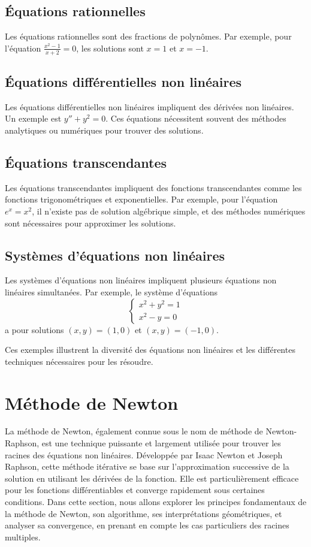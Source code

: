 \documentclass{article}
\begin{document}
\subsection{Équations rationnelles}
Les équations rationnelles sont des fractions de polynômes. Par exemple, pour l'équation $\frac{x^2 - 1}{x + 2} = 0$, les solutions sont $x = 1$ et $x = -1$.

\subsection{Équations différentielles non linéaires}
Les équations différentielles non linéaires impliquent des dérivées non linéaires. Un exemple est $y'' + y^2 = 0$. Ces équations nécessitent souvent des méthodes analytiques ou numériques pour trouver des solutions.

\subsection{Équations transcendantes}
Les équations transcendantes impliquent des fonctions transcendantes comme les fonctions trigonométriques et exponentielles. Par exemple, pour l'équation $e^x = x^2$, il n'existe pas de solution algébrique simple, et des méthodes numériques sont nécessaires pour approximer les solutions.

\subsection{Systèmes d'équations non linéaires}
Les systèmes d'équations non linéaires impliquent plusieurs équations non linéaires simultanées. Par exemple, le système d'équations
\[
\begin{cases}
x^2 + y^2 = 1 \\
x^2 - y = 0
\end{cases}
\]
a pour solutions $(x, y) = (1, 0)$ et $(x, y) = (-1, 0)$.

Ces exemples illustrent la diversité des équations non linéaires et les différentes techniques nécessaires pour les résoudre.

\section{Méthode de Newton}

La méthode de Newton, également connue sous le nom de méthode de Newton-Raphson, est une technique puissante et largement utilisée pour trouver les racines des équations non linéaires. Développée par Isaac Newton et Joseph Raphson, cette méthode itérative se base sur l'approximation successive de la solution en utilisant les dérivées de la fonction. Elle est particulièrement efficace pour les fonctions différentiables et converge rapidement sous certaines conditions. Dans cette section, nous allons explorer les principes fondamentaux de la méthode de Newton, son algorithme, ses interprétations géométriques, et analyser sa convergence, en prenant en compte les cas particuliers des racines multiples.
\end{document}
